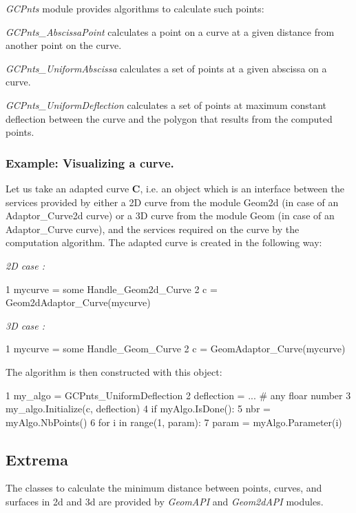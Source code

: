 {\itshape G\+C\+Pnts} module provides algorithms to calculate such points\+:
\begin{DoxyItemize}
\item {\itshape G\+C\+Pnts\+\_\+\+Abscissa\+Point} calculates a point on a curve at a given distance from another point on the curve.
\item {\itshape G\+C\+Pnts\+\_\+\+Uniform\+Abscissa} calculates a set of points at a given abscissa on a curve.
\item {\itshape G\+C\+Pnts\+\_\+\+Uniform\+Deflection} calculates a set of points at maximum constant deflection between the curve and the polygon that results from the computed points.
\end{DoxyItemize}

\subsubsection*{Example\+: Visualizing a curve.}

Let us take an adapted curve {\bfseries C}, i.\+e. an object which is an interface between the services provided by either a 2D curve from the module Geom2d (in case of an Adaptor\+\_\+\+Curve2d curve) or a 3D curve from the module Geom (in case of an Adaptor\+\_\+\+Curve curve), and the services required on the curve by the computation algorithm. The adapted curve is created in the following way\+:

{\itshape 2D case \+:} 
\begin{DoxyCode}
1 mycurve = some Handle\_Geom2d\_Curve
2 c = Geom2dAdaptor\_Curve(mycurve)
\end{DoxyCode}


{\itshape 3D case \+:} 
\begin{DoxyCode}
1 mycurve = some Handle\_Geom\_Curve 
2 c = GeomAdaptor\_Curve(mycurve) 
\end{DoxyCode}


The algorithm is then constructed with this object\+:


\begin{DoxyCode}
1 my\_algo = GCPnts\_UniformDeflection 
2 deflection = ... \textcolor{comment}{# any floar number}
3 my\_algo.Initialize(c, deflection)
4 \textcolor{keywordflow}{if} myAlgo.IsDone():
5   nbr = myAlgo.NbPoints()
6   \textcolor{keywordflow}{for} i \textcolor{keywordflow}{in} range(1, param): 
7     param = myAlgo.Parameter(i)
\end{DoxyCode}
\hypertarget{occt_user_guides__modeling_data_occt_modat_1_5}{}\subsection{Extrema}\label{occt_user_guides__modeling_data_occt_modat_1_5}
The classes to calculate the minimum distance between points, curves, and surfaces in 2d and 3d are provided by {\itshape Geom\+A\+PI} and {\itshape Geom2d\+A\+PI} modules.

